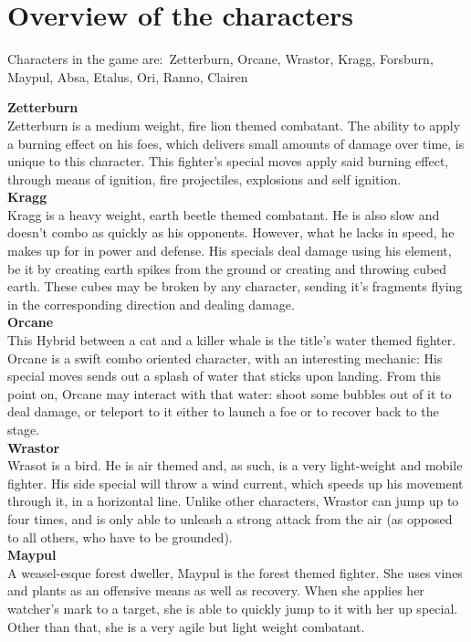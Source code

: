 \documentclass{article}
\begin{document}
\chapter{Overview of the characters}

Characters in the game are:\
Zetterburn, Orcane, Wrastor, Kragg, Forsburn, Maypul, Absa, Etalus, Ori, Ranno, Clairen %

\textbf{Zetterburn}\\
Zetterburn is a medium weight, fire lion themed combatant. The ability to apply a burning effect on his foes, which delivers small amounts of damage over time, is unique to this character. This fighter's special moves apply said burning effect, through means of ignition, fire projectiles, explosions and self ignition.\\
\textbf{Kragg}\\
Kragg is a heavy weight, earth beetle themed combatant. He is also slow and doesn't combo as quickly as his opponents. However, what he lacks in speed, he makes up for in power and defense. His specials deal damage using his element, be it by creating earth spikes from the ground or creating and throwing cubed earth. These cubes may be broken by any character, sending it's fragments flying in the corresponding direction and dealing damage.\\
\textbf{Orcane}\\
This Hybrid between a cat and a killer whale is the title's water themed fighter. Orcane is a swift combo oriented character, with an interesting mechanic: His special moves sends out a splash of water that sticks upon landing. From this point on, Orcane may interact with that water: shoot some bubbles out of it to deal damage, or teleport to it either to launch a foe or to recover back to the stage.\\
\textbf{Wrastor}\\
Wrasot is a bird. He is air themed and, as such, is a very light-weight and mobile fighter. His side special will throw a wind current, which speeds up his movement through it, in a horizontal line. Unlike other characters, Wrastor can jump up to four times, and is only able to unleash a strong attack from the air (as opposed to all others, who have to be grounded).
\\
\textbf{Maypul}\\
A weasel-esque forest dweller, Maypul is the forest themed fighter. She uses vines and plants as an offensive means as well as recovery. When she applies her watcher's mark to a target, she is able to quickly jump to it with her up special. Other than that, she is a very agile but light weight combatant.
\end{document}
